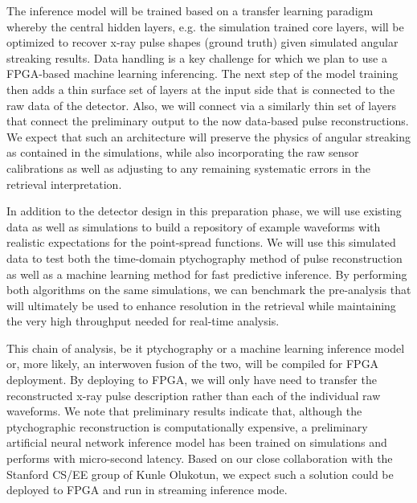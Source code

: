 The inference model will be trained based on a transfer learning paradigm whereby the central hidden layers, e.g. the simulation trained core layers, will be optimized to recover x-ray pulse shapes (ground truth) given simulated angular streaking results.
Data handling is a key challenge for which we plan to use a FPGA-based machine learning inferencing.
The next step of the model training then adds a thin surface set of layers at the input side that is connected to the raw data of the detector.
Also, we will connect via a similarly thin set of layers that connect the preliminary output to the now data-based pulse reconstructions.
We expect that such an architecture will preserve the physics of angular streaking as contained in the simulations, while also incorporating the raw sensor calibrations as well as adjusting to any remaining systematic errors in the retrieval interpretation.

In addition to the detector design in this preparation phase, we will use existing data as well as simulations to build a repository of example waveforms with realistic expectations for the point-spread functions.  
We will use this simulated data to test both the time-domain ptychography method of pulse reconstruction as well as a machine learning method for fast predictive inference.
By performing both algorithms on the same simulations, we can benchmark the pre-analysis that will ultimately be used to enhance resolution in the retrieval while maintaining the very high throughput needed for real-time analysis.

This chain of analysis, be it ptychography or a machine learning inference model or, more likely, an interwoven fusion of the two, will be compiled for FPGA deployment.  
By deploying to FPGA, we will only have need to transfer the reconstructed x-ray pulse description rather than each of the individual raw waveforms. 
We note that preliminary results indicate that, although the ptychographic reconstruction is computationally expensive, a preliminary artificial neural network inference model has been trained on simulations and performs with micro-second latency.  
Based on our close collaboration with the Stanford CS/EE group of Kunle Olukotun, we expect such a solution could be deployed to FPGA and run in streaming inference mode.
